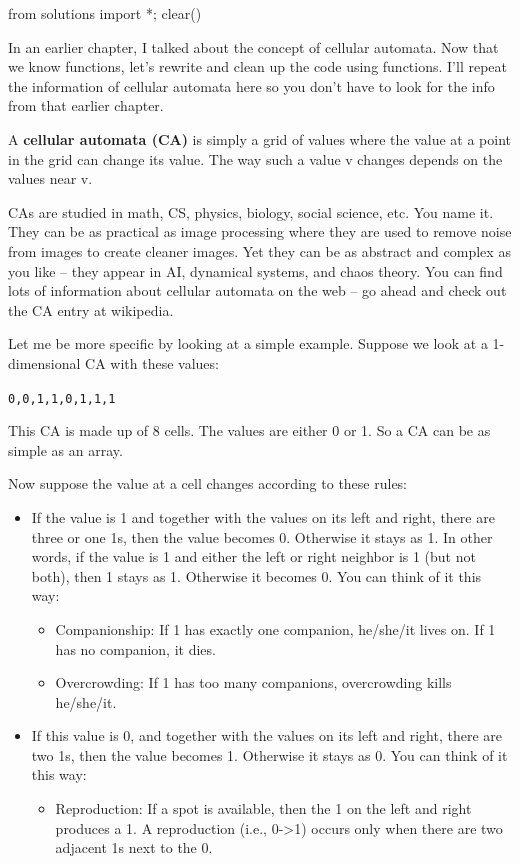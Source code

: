 \begin{python0}
from solutions import *; clear()
\end{python0}

In an earlier chapter, I talked about the concept of cellular automata.
Now that we know functions, let's rewrite and clean up the code using
functions. I'll repeat the information of cellular automata here so you
don't have to look for the info from that earlier chapter.

A \textbf{cellular automata (CA)} is simply a grid of values where the
value at a point in the grid can change its value. The way such a value
v changes depends on the values near v.

CAs are studied in math, CS, physics, biology, social science, etc. You
name it. They can be as practical as image processing where they are
used to remove noise from images to create cleaner images. Yet they can
be as abstract and complex as you like -- they appear in AI, dynamical
systems, and chaos theory. You can find lots of information about
cellular automata on the web -- go ahead and check out the CA entry at
wikipedia.

Let me be more specific by looking at a simple example. Suppose we look at a 1-dimensional CA with these values:
\begin{center}
\texttt{0,0,1,1,0,1,1,1}
\end{center}
This CA is made up of 8 cells. The values are either 0 or 1. So a CA can be as simple as an array.

Now suppose the value at a cell changes according to these rules:

\begin{itemize}
\item
  If the value is 1 and together with the values on its left and right, there are three or one 1s, then the value becomes 0. Otherwise it stays as 1. In other words, if the value is 1 and either the left or right neighbor is 1 (but not both), then 1 stays as 1. Otherwise it becomes 0. You can think of it this way:

  \begin{itemize}
  \item
    Companionship: If 1 has exactly one companion, he/she/it lives on. If 1 has no companion, it dies.
  \item
    Overcrowding: If 1 has too many companions, overcrowding kills he/she/it.
  \end{itemize}
\item
  If this value is 0, and together with the values on its left and right, there are two 1s, then the value becomes 1. Otherwise it stays as 0. You can think of it this way:

  \begin{itemize}
  \item
    Reproduction: If a spot is available, then the 1 on the left and right produces a 1. A reproduction (i.e., 0-\textgreater1) occurs only when there are two adjacent 1s next to the 0.
  \end{itemize}
\end{itemize}

